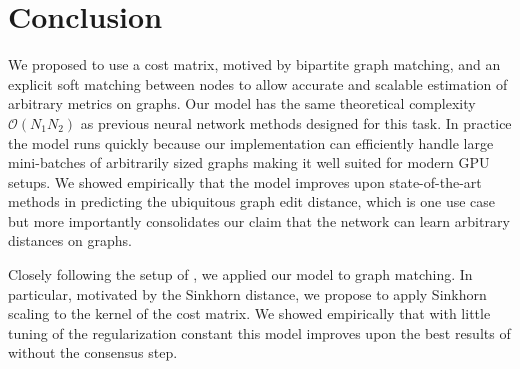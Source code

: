 \section{Conclusion}


We proposed to use a cost matrix, motived by bipartite graph matching, and an explicit soft matching between nodes to allow accurate and scalable estimation of arbitrary metrics on graphs. Our model has the same theoretical complexity $\mathcal{O}(N_1 N_2)$ as previous neural network methods designed for this task. In practice the model runs quickly because our implementation can efficiently handle large mini-batches of arbitrarily sized graphs making it well suited for modern GPU setups. We showed empirically that the model improves upon state-of-the-art methods in predicting the ubiquitous graph edit distance, which is one use case but more importantly consolidates our claim that the network can learn arbitrary distances on graphs.



Closely following the setup of \cite{fey2020_update}, we applied our model to graph matching. In particular, motivated by the Sinkhorn distance, we propose to apply Sinkhorn scaling to the kernel of the cost matrix. We showed empirically that with little tuning of the regularization constant this model improves upon the best results of \cite{fey2020_update} without the consensus step.

